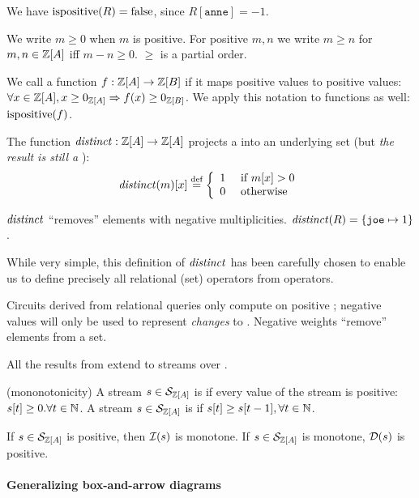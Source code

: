 \ifzsetexamples
We have $\mbox{ispositive}(R) = \mbox{false}$, since $R[\texttt{anne}] = -1$.
\fi

We write $m \geq 0$ when $m$ is
positive.  For positive $m, n$ we write $m \geq n$ for $m, n
\in \mathbb{Z}[A]$ iff $m - n \geq 0$.  $\geq$ is a partial order.

We call a function $f : \mathbb{Z}[A] \rightarrow \mathbb{Z}[B]$  if it maps
positive values to positive values:
$\forall x \in \mathbb{Z}[A], x \geq 0_{\mathbb{Z}[A]} \Rightarrow f(x) \geq 0_{\mathbb{Z}[B]}$.  
We apply this notation to functions as well: $\mbox{ispositive}(f)$.

\begin{definition}[distinct]
The function $\mathit{distinct}: \mathbb{Z}[A] \rightarrow \mathbb{Z}[A]$
projects a \zr into an underlying set (but \emph{the result is
  still a \zr}):
$$\mathit{distinct}(m)[x] \stackrel{\textrm{\scriptsize def}}{=} \left\{
\begin{array}{ll}
  1 & \mbox{ if } m[x] > 0 \\
  0 & \mbox{ otherwise}
\end{array}
\right.
$$
\end{definition}

$\mathit{distinct}$ ``removes'' elements with negative multiplicities.
\ifzsetexamples
$\mathit{distinct}(R) = \{ \texttt{joe} \mapsto 1 \}$.
\fi

While very simple, this definition of $\mathit{distinct}$ has been carefully 
chosen to enable us to define precisely all relational (set) operators
from \zrs operators.

Circuits derived from relational queries only compute on positive \zrs; 
negative values will only be used to represent \emph{changes} to \zrs.
Negative weights ``remove'' elements from a set.

All the results from  extend to streams over \zrs. 

\begin{definition}(mononotonicity)
A stream $s \in \mathcal{S}_{\mathbb{Z}[A]}$ is  if every value of the stream is positive:
$s[t] \geq 0 . \forall t \in \mathbb{N}$.
A stream $s \in \mathcal{S}_{\mathbb{Z}[A]}$ is  if $s[t] \geq s[t-1], \forall t \in \mathbb{N}$.
\end{definition}

If $s \in \mathcal{S}_{\mathbb{Z}[A]}$ is positive, then $\mathcal{I}(s)$ is monotone.
If $s \in \mathcal{S}_{\mathbb{Z}[A]}$ is monotone, $\mathcal{D}(s)$ is positive.

\paragraph{Generalizing box-and-arrow diagrams}

